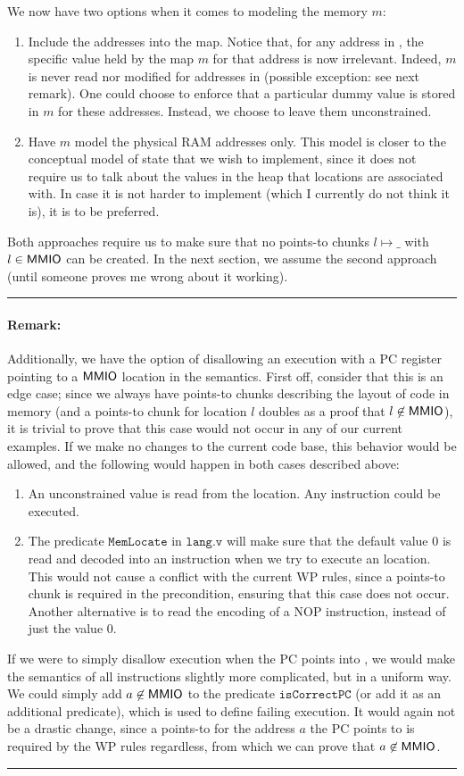 \documentclass{article}
\newcommand{\X}[1]{\ensuremath{\mathrm{#1}}}
\newcommand{\I}[1]{\ensuremath{\mathtt{#1}}}
\newcommand{\MMIO}{\textlog{MMIO}\xspace}
\newenvironment{remark}
{ \bigskip\hrule\vspace{-1.3em}\nobreak
  \paragraph*{Remark:}}
{\vspace*{0.5em}\hrule\medskip}
\begin{document}
We now have two options when it comes to modeling the memory $m$:
\begin{enumerate}
\item Include the \MMIO addresses into the map. Notice that, for any address in \MMIO, the specific value held by the map $m$ for
that address is now irrelevant. Indeed, $m$ is never read nor modified for
addresses in \MMIO (possible exception: see next remark). One could choose to enforce that a particular dummy value is stored in $m$ for these addresses. Instead, we choose to leave them
unconstrained.
\item Have $m$ model the physical RAM addresses only. This model is closer to
  the conceptual model of state that we wish to implement, since it does not
  require us to talk about the values in the heap that \MMIO locations are
  associated with. In case it is not harder to implement (which I currently do not think
  it is), it is to be preferred.
\end{enumerate}
Both approaches require us to make sure that no points-to chunks $l \mapsto \_$
with $l \in \MMIO$ can be created. In the next section, we assume the second
approach (until someone proves me wrong about it working).

\begin{remark}
  Additionally, we have the option of disallowing an execution
  with a \X{PC} register pointing to a $\MMIO$ location in the semantics.
  First off, consider that this is an edge case; since we always have points-to
  chunks describing the layout of code in memory (and a points-to chunk for
  location $l$ doubles as a proof that $l \not\in \MMIO$), it is trivial to prove that
  this case would not occur in any of our current examples.
  If we make no changes to the current code base, this behavior would be
  allowed, and the following would happen in both cases described above:
  \begin{enumerate}
  \item An unconstrained value is read from the location. Any instruction could
    be executed.
  \item The predicate $\I{MemLocate}$ in $\I{lang.v}$ will make sure
  that the default value $0$ is read and decoded into an instruction when we try
  to execute an \MMIO location.
  This would not cause a conflict with the current WP rules,
  since a points-to chunk is required in the precondition, ensuring that this
  case does not occur.
  Another alternative is to read the encoding of a $\X{NOP}$ instruction, instead of
  just the value $0$.
\end{enumerate}
  If we were to simply disallow execution when the PC points into \MMIO, we would make the semantics of all instructions slightly more complicated, but in a
  uniform way.
  We could simply add $a \not\in \MMIO$ to the predicate $\I{isCorrectPC}$ (or
  add it as an additional predicate), which is used to define failing execution.
  It would again not be a drastic change, since a points-to for the
  address $a$ the PC points to is required by the WP rules regardless, from which we
  can prove that $a \not\in \MMIO$.
\end{remark}
\end{document}
